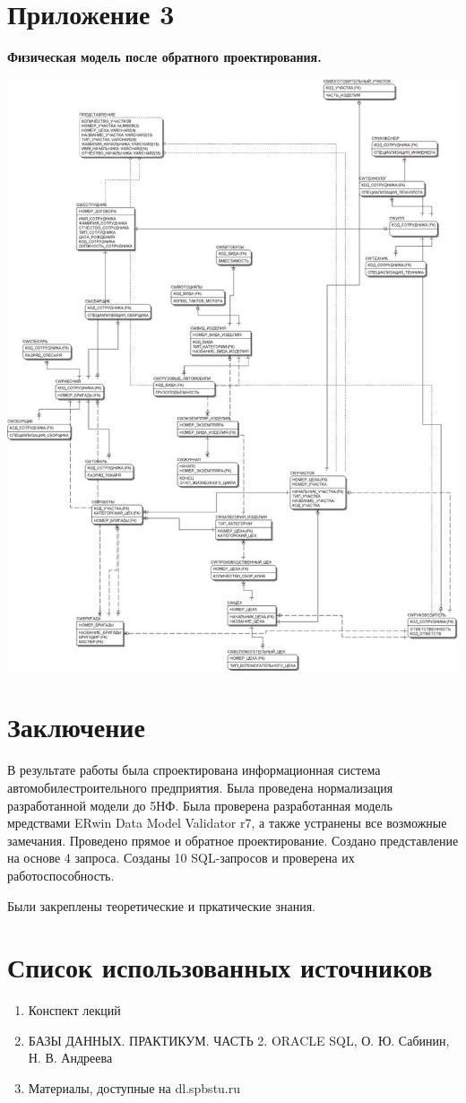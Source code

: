 \newpage

\section{Приложение 3}

    {\bf Физическая модель после обратного проектирования.}

    \includegraphics[width=16cm]{./screenshots/model/reverse.jpg}

\newpage

\section{Заключение}
В результате работы была спроектирована информационная система автомобилестроительного предприятия.
Была проведена нормализация разработанной модели до 5НФ.
Была проверена разработанная модель мредствами ERwin Data Model Validator r7, а также устранены все возможные замечания.
Проведено прямое и обратное проектирование.
Создано представление на основе 4 запроса.
Созданы 10 SQL-запросов и проверена их работоспособность.

Были закреплены теоретические и пркатические знания.

\section{Список использованных источников}

\begin{enumerate}

    \item Конспект лекций
    \item БАЗЫ ДАННЫХ. ПРАКТИКУМ. ЧАСТЬ 2. ORACLE SQL, О. Ю. Сабинин, Н. В. Андреева
    \item Материалы, доступные на dl.spbstu.ru

\end{enumerate}

